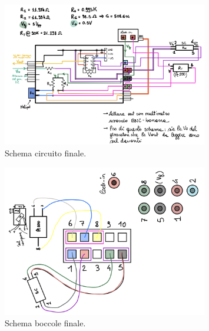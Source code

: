 \documentclass[../main/main.tex]{subfiles}
\begin{document}
\begin{figure}[h!]
\centering
\includegraphics[width=0.8\textwidth]{../lessons/image/12/3.png}
\caption{\label{fig:12_3} Schema circuito finale.}
\end{figure}

\begin{figure}[h!]
\centering
\includegraphics[width=0.8\textwidth]{../lessons/image/12/4.png}
\caption{\label{fig:12_4} Schema boccole finale.}
\end{figure}
\end{document}
